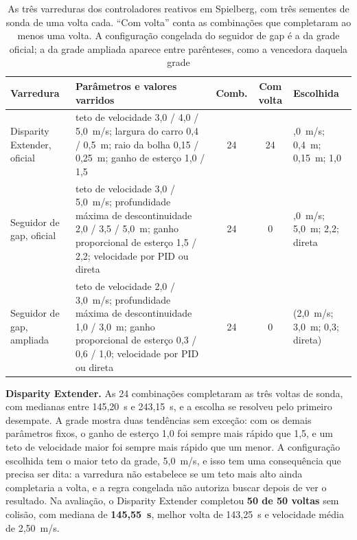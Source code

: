 \begin{table}[htb]
    \centering
    \footnotesize
    \setlength{\tabcolsep}{3pt}
    \begin{tabularx}{\textwidth}{|l|>{\raggedright\arraybackslash}X|c|c|>{\raggedright\arraybackslash}p{3.0cm}|}
        \hline
        \textbf{Varredura} & \textbf{Parâmetros e valores varridos} &
        \textbf{Comb.} & \textbf{Com volta} & \textbf{Escolhida} \\
        \hline
        Disparity Extender, oficial &
        teto de velocidade 3,0 / 4,0 / 5,0~m/s; largura do carro 0,4 / 0,5~m;
        raio da bolha 0,15 / 0,25~m; ganho de esterço 1,0 / 1,5 &
        24 & 24 & 5,0~m/s; 0,4~m; 0,15~m; 1,0 \\
        \hline
        Seguidor de gap, oficial &
        teto de velocidade 3,0 / 5,0~m/s; profundidade máxima de
        descontinuidade 2,0 / 3,5 / 5,0~m; ganho proporcional de esterço
        1,5 / 2,2; velocidade por PID ou direta &
        24 & 0 & 3,0~m/s; 5,0~m; 2,2; direta \\
        \hline
        Seguidor de gap, ampliada &
        teto de velocidade 2,0 / 3,0~m/s; profundidade máxima de
        descontinuidade 1,0 / 3,0~m; ganho proporcional de esterço
        0,3 / 0,6 / 1,0; velocidade por PID ou direta &
        24 & 0 & (2,0~m/s; 3,0~m; 0,3; direta) \\
        \hline
    \end{tabularx}
    \caption{As três varreduras dos controladores reativos em Spielberg, com
    três sementes de sonda de uma volta cada. ``Com volta'' conta as combinações
    que completaram ao menos uma volta. A configuração congelada do seguidor de
    gap é a da grade oficial; a da grade ampliada aparece entre parênteses, como
    a vencedora daquela grade}
    \label{tab:res_varreduras}
\end{table}

\textbf{Disparity Extender.} As 24 combinações completaram as três voltas de
sonda, com medianas entre 145,20~s e 243,15~s, e a escolha se resolveu pelo
primeiro desempate. A grade mostra duas tendências sem exceção: com os demais
parâmetros fixos, o ganho de esterço 1,0 foi sempre mais rápido que 1,5, e um teto
de velocidade maior foi sempre mais rápido que um menor. A configuração escolhida
tem o maior teto da grade, 5,0~m/s, e isso tem uma consequência que precisa ser
dita: a varredura não estabelece se um teto mais alto ainda completaria a volta, e
a regra congelada não autoriza buscar depois de ver o resultado. Na avaliação, o
Disparity Extender completou \textbf{50 de 50 voltas} sem colisão, com mediana de
\textbf{145,55~s}, melhor volta de 143,25~s e velocidade média de 2,50~m/s.

